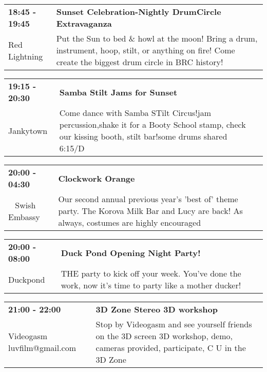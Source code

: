 \begin{tabular}{ p{1in} p{2.2in} }
    \textbf{18:45 - 19:45} & \textbf{Sunset Celebration-Nightly DrumCircle Extravaganza} \\
    Red Lightning \newline  & Put the Sun to bed \& howl at the moon! Bring a drum, instrument, hoop, stilt, or anything on fire! Come create the biggest drum circle in BRC history! \\
    \hline 
\end{tabular}
    
\begin{tabular}{ p{1in} p{2.2in} }
    \textbf{19:15 - 20:30} & \textbf{Samba Stilt Jams for Sunset} \\
    Jankytown \newline  & Come dance with Samba STilt Circus!jam percussion,shake it for a Booty School stamp, check our kissing booth, stilt bar!some drums shared~ 6:15/D \\
    \hline 
\end{tabular}
    
\begin{tabular}{ p{1in} p{2.2in} }
    \textbf{20:00 - 04:30} & \textbf{Clockwork Orange} \\
    ~ \newline Swish Embassy & Our second annual previous year's 'best of' theme party. The Korova Milk Bar and Lucy are back! As always, costumes are highly encouraged \\
    \hline 
\end{tabular}
    
\begin{tabular}{ p{1in} p{2.2in} }
    \textbf{20:00 - 08:00} & \textbf{Duck Pond Opening Night Party!} \\
    Duckpond \newline  & THE party to kick off your week. You've done the work, now it's time to party like a mother ducker! \\
    \hline 
\end{tabular}
    
\begin{tabular}{ p{1in} p{2.2in} }
    \textbf{21:00 - 22:00} & \textbf{3D Zone Stereo 3D workshop } \\
    Videogasm \newline luvfilm@gmail.com & Stop by Videogasm and see yourself friends on the 3D screen  3D workshop, demo, cameras provided, participate, C U in the 3D Zone \\
    \hline 
\end{tabular}
    
